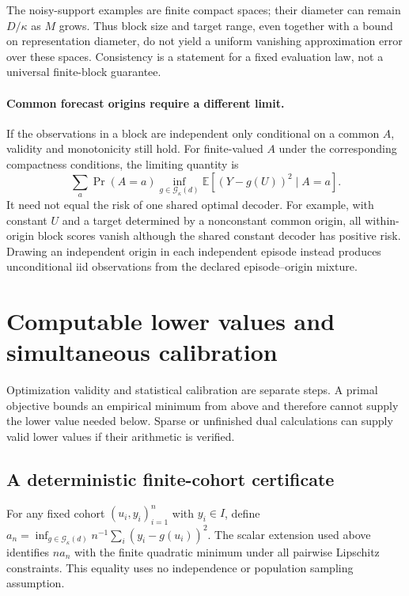 The noisy-support examples are finite compact spaces; their diameter can
remain $D/\kappa$ as $M$ grows. Thus block size and target range, even
together with a bound on representation diameter, do not yield a uniform
vanishing approximation error over these spaces. Consistency is a statement
for a fixed evaluation law, not a universal finite-block guarantee.

\paragraph{Common forecast origins require a different limit.}
If the observations in a block are independent only conditional on a common
$A$, validity and monotonicity still hold. For finite-valued $A$ under the
corresponding compactness conditions, the limiting quantity is
\[
 \sum_a\Pr(A=a)\inf_{g\in\mathcal G_\kappa(d)}
                  \mathbb E[(Y-g(U))^2\mid A=a].
\]
It need not equal the risk of one shared optimal decoder. For example,
with constant $U$ and a target determined by a nonconstant common origin,
all within-origin block scores vanish although the shared constant decoder
has positive risk. Drawing an independent origin in each independent
episode instead produces unconditional iid observations from the declared
episode--origin mixture.

\section{Computable lower values and simultaneous calibration}
\label{sec:calibration}

Optimization validity and statistical calibration are separate steps. A
primal objective bounds an empirical minimum from above and therefore
cannot supply the lower value needed below. Sparse or unfinished dual
calculations can supply valid lower values if their arithmetic is verified.

\subsection{A deterministic finite-cohort certificate}

For any fixed cohort $(u_i,y_i)_{i=1}^n$ with $y_i\in I$, define
$a_n=\inf_{g\in\mathcal G_\kappa(d)}n^{-1}\sum_i(y_i-g(u_i))^2$.
The scalar extension used above identifies $n a_n$ with the finite
quadratic minimum under all pairwise Lipschitz constraints. This equality
uses no independence or population sampling assumption.

